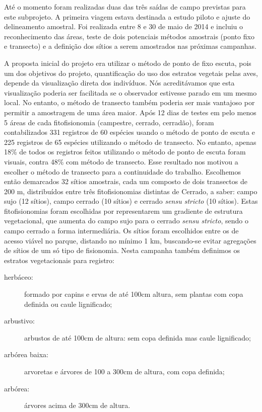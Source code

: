 \documentclass[12pt, A4]{article}
\begin{document}
Até o momento foram realizadas duas das três saídas de campo previstas
para este subprojeto. A primeira viagem estava destinada a estudo piloto
e ajuste do delineamento amostral. Foi realizada entre 8 e 30 de
maio de 2014 e incluiu o reconhecimento das áreas, teste de dois
potenciais métodos amostrais (ponto fixo e transecto) 
e a definição dos sítios a serem amostrados nas próximas campanhas. 

A proposta inicial do projeto era utilizar o método de ponto de
fixo escuta, pois um dos objetivos do projeto, quantificação do uso dos
estratos vegetais pelas aves, depende da visualização direta dos
indivíduos. Nós acreditávamos que esta visualização poderia ser
facilitada se o observador estivesse parado em um mesmo local. No
entanto, o método de transecto também poderia ser mais vantajoso por
permitir a amostragem de uma área maior. 
 Após 12 dias de testes em 
pelo menos 5 áreas de cada fitofisionomia (campestre, cerrado, cerradão),
foram contabilizados 331 registros de 60 espécies usando o método de
ponto de escuta e 225 registros de 65 espécies utilizando o método de
transecto. No entanto, apenas 18\% de todos os registros feitos
utilizando o método de ponto de escuta foram visuais, contra 48\%
com  método de transecto. Esse resultado nos motivou a escolher o método de
transecto para a continuidade do trabalho.
Escolhemos então demarcados 32 sítios amostrais,
cada um composto de dois transectos de 200 m, distribuídos entre três
fitofisionomias distintas de Cerrado, a saber: campo sujo (12 sítios), campo
cerrado (10 sítios) e cerrado \textit{sensu stricto} (10 sítios). 
Estas fitofisionomias foram
escolhidas por representarem um gradiente de estrutura vegetacional,
que aumenta do campo sujo para o cerrado \textit{sensu stricto}, sendo
o campo cerrado a forma intermediária. Os sítios foram escolhidos entre
os de acesso viável no parque, distando no mínimo 1 km, buscando-se
evitar agregações de sítios de um só tipo de fisionomia. 
Nesta campanha também definimos os estratos vegetacionais para registro: 
\begin{description}
\item[herbáceo:] formado por capins e ervas de até 100cm altura, sem plantas com copa definida ou caule lignificado;
\item[arbustivo:] arbustos de até 100cm de altura: sem copa definida mas caule lignificado;
\item[arbórea baixa:] arvoretas e árvores de 100 a 300cm de altura, com copa definida;
\item[arbórea:] árvores acima de 300cm de altura. 
\end{description}
\end{document}
